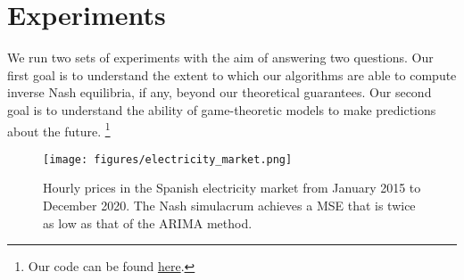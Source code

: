 \section{Experiments}
\vspace{-1em}
We run two sets of experiments with the aim of answering two questions. 
Our first goal is to understand the extent to which our algorithms are able to compute inverse Nash equilibria, if any, beyond our theoretical guarantees.
Our second goal is to understand the ability of game-theoretic models to make predictions about the future.%
\footnote{Our code can be found \href{https://anonymous.4open.science/r/Generative-Adversarial-Inverse-Multiagent-Learning-ICLR2024-1C2C/}{here}. }

\begin{wrapfigure}{R}{0.4\textwidth}
    \centering
    \vspace{-1cm}
    \texttt{[image: figures/electricity\_market.png]}
    \caption{Hourly prices in the Spanish electricity market from January 2015 to December 2020. The Nash simulacrum achieves a MSE that is twice as low as that of the ARIMA method.}
    \label{fig:electricity_market}
    \vspace{-0.5cm}
\end{wrapfigure}

